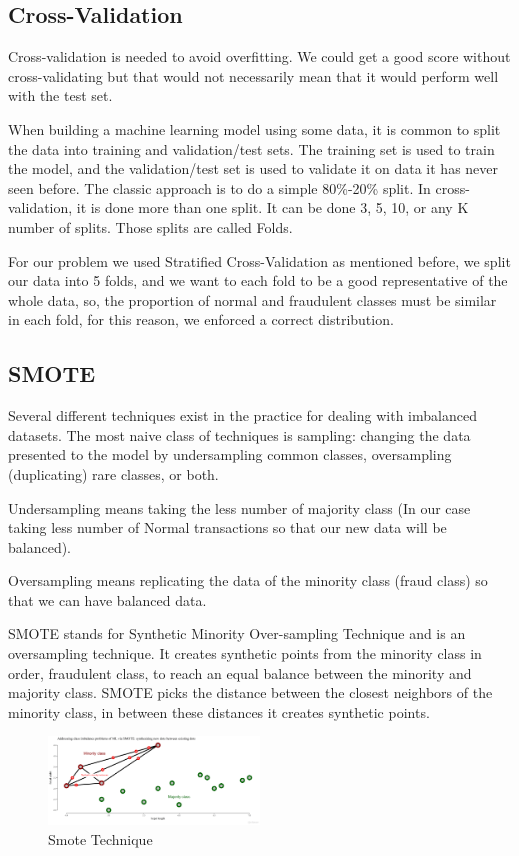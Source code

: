 \documentclass[conference]{IEEEtran}
\begin{document}
\subsection{Cross-Validation}
Cross-validation is needed to avoid overfitting. We could get a good score without cross-validating but that would not necessarily mean that it would perform well with the test set. 

When building a machine learning model using some data, it is common to split the data into training and validation/test sets. The training set is used to train the model, and the validation/test set is used to validate it on data it has never seen before. The classic approach is to do a simple 80\%-20\% split. In cross-validation, it is done more than one split. It can be done 3, 5, 10, or any K number of splits. Those splits are called Folds. \cite{cross_val}

For our problem we used Stratified Cross-Validation as mentioned before, we split our data into 5 folds, and we want to each fold to be a good representative of the whole data, so, the proportion of normal and fraudulent classes must be similar in each fold, for this reason, we enforced a correct distribution.

\subsection{SMOTE}

Several different techniques exist in the practice for dealing with imbalanced datasets. The most naive class of techniques is sampling: changing the data presented to the model by undersampling common classes, oversampling (duplicating) rare classes, or both.

Undersampling means taking the less number of majority class (In our case taking less number of Normal transactions so that our new data will be balanced).

Oversampling means replicating the data of the minority class (fraud class) so that we can have balanced data.

SMOTE stands for Synthetic Minority Over-sampling Technique and is an oversampling technique. It creates synthetic points from the minority class in order, fraudulent class, to reach an equal balance between the minority and majority class. SMOTE picks the distance between the closest neighbors of the minority class, in between these distances it creates synthetic points.

\begin{figure}[H]
        \centering\includegraphics[width=0.5\textwidth]{images/SMOTE.png}
    \caption{Smote Technique}
    \label{fig:smote_tech}
\end{figure}
\end{document}
